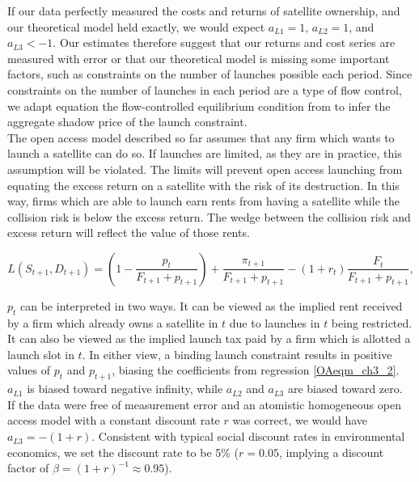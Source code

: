 \documentclass[12pt]{article}
\begin{document}
If our data perfectly measured the costs and returns of satellite ownership, and our theoretical model held exactly, we would expect $a_{L 1}=1$, $a_{L 2} = 1$, and $a_{L 3} < -1$. Our estimates therefore suggest that our returns and cost series are measured with error or that our theoretical model is missing some important factors, such as constraints on the number of launches possible each period. Since constraints on the number of launches in each period are a type of flow control, we adapt equation the flow-controlled equilibrium condition from \cite{raoJMP} to infer the aggregate shadow price of the launch constraint. \\

The open access model described so far assumes that any firm which wants to launch a satellite can do so. If launches are limited, as they are in practice, this assumption will be violated. The limits will prevent open access launching from equating the excess return on a satellite with the risk of its destruction. In this way, firms which are able to launch earn rents from having a satellite while the collision risk is below the excess return. The wedge between the collision risk and excess return will reflect the value of those rents.

\begin{equation}
\label{OAfloweqmcond}
L(S_{t+1},D_{t+1}) = (1 - \frac{p_t}{F_{t+1} + p_{t+1}}) + \frac{\pi_{t+1}}{F_{t+1} + p_{t+1}} - (1+r_t)\frac{F_t}{F_{t+1} + p_{t+1}},
\end{equation}

$p_t$ can be interpreted in two ways. It can be viewed as the implied rent received by a firm which already owns a satellite in $t$ due to launches in $t$ being restricted. It can also be viewed as the implied launch tax paid by a firm which is allotted a launch slot in $t$. In either view, a binding launch constraint results in positive values of $p_t$ and $p_{t+1}$, biasing the coefficients from regression \ref{OAeqm_ch3_2}. $a_{L1}$ is biased toward negative infinity, while $a_{L 2}$ and $a_{L 3}$ are biased toward zero. \\

If the data were free of measurement error and an atomistic homogeneous open access model with a constant discount rate $r$ was correct, we would have $a_{L3} = - (1+r)$. Consistent with typical social discount rates in environmental economics, we set the discount rate to be 5\% ($r=0.05$, implying a discount factor of $\beta = (1+r)^{-1} \approx 0.95$). \\
\end{document}
